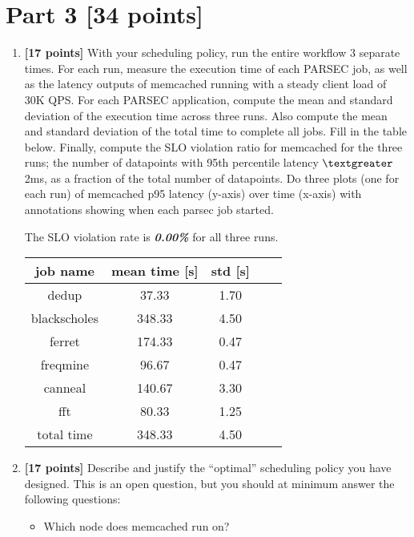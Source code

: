 \documentclass[11pt]{article}
\begin{document}
%         

%       
      
    




\section*{Part 3 [34 points]}
\begin{enumerate}
    \item \textbf{[17 points]} With your scheduling policy, run the entire workflow 3 separate times. For each run, measure the execution time of each PARSEC job, as well as the latency outputs of memcached running with a steady client load of 30K QPS. For each PARSEC application, compute the mean and standard deviation of the execution time across three runs. Also compute the mean and standard deviation of the total time to complete all jobs. Fill in the table below. Finally, compute the SLO violation ratio for memcached for the three runs; the number of datapoints with 95th percentile latency $\textgreater$ 2ms, as a fraction of the total number of datapoints.  Do three plots (one for each run) of memcached p95 latency (y-axis) over time (x-axis) with annotations showing when each parsec job started.
    
    
    The SLO violation rate is \textbf{\emph{0.00\%}} for all three runs.
    \begin{table}[h]
        \centering
        \begin{tabular}{ |c|c|c|c|c|} 
            \hline
            job name & mean time [s] & std [s] \\ \hline \hline
            dedup         & 37.33 & 1.70 \\  \hline
            blackscholes  & 348.33 & 4.50 \\  \hline
            ferret        & 174.33 &  0.47 \\  \hline
            freqmine      & 96.67 & 0.47 \\  \hline
            canneal       & 140.67 & 3.30 \\  \hline
            fft           & 80.33	 & 1.25 \\  \hline
            total time    & 348.33 & 	4.50\\ \hline
        \end{tabular}
    \end{table}
    \item \textbf{[17 points]} Describe and justify the “optimal” scheduling policy you have designed. This is an open question, but you should at minimum answer the following questions: 
    \begin{itemize}
        \item	Which node does memcached run on?
        

\end{itemize}
\end{enumerate}
\end{document}
